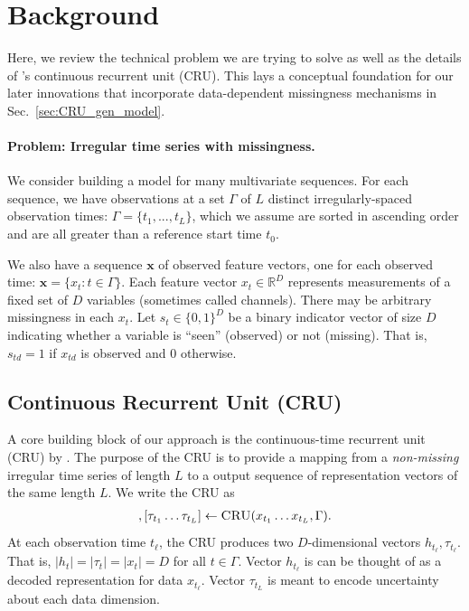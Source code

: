 \newcommand{\MExp}{{\small \textsc{MExp}}}
\section{Background}
Here, we review the technical problem we are trying to solve as well as the details of \citet{schirmer2022modeling}'s
continuous recurrent unit (CRU). 
This lays a conceptual foundation for our later innovations that incorporate data-dependent missingness mechanisms in Sec.~\ref{sec:CRU_gen_model}.


\paragraph{Problem: Irregular time series with missingness.}
We consider building a model for many multivariate sequences.
For each sequence, we have observations at a set $\Gamma$ of $L$ distinct irregularly-spaced observation times: $\Gamma=\{ t_1, ..., t_L\}$, which we assume are sorted in ascending order and are all greater than a reference start time $t_0$.

We also have a sequence $\mathbf{x}$ of observed feature vectors, one for each observed time: $\mathbf{x} = \{x_t : t \in \Gamma \}$. 
Each feature vector $x_t \in \mathbb{R}^D$ represents measurements of a fixed set of $D$ variables (sometimes called channels). There may be arbitrary missingness in each $x_t$. 
Let $s_t \in \{0, 1\}^D$ be a binary indicator vector of size $D$ indicating whether a variable is ``seen'' (observed) or not (missing). That is, $s_{td} = 1$ if $x_{td}$ is observed and 0 otherwise.

\subsection{Continuous Recurrent Unit (CRU)}
\label{sec:CRU}

A core building block of our approach is the continuous-time recurrent unit (CRU) by \citet{schirmer2022modeling}. The purpose of the CRU is to provide a  mapping from a \emph{non-missing} irregular time series of length $L$ to a output sequence of representation vectors of the same length $L$. We write the CRU as
\begin{align}
    [h_{t_1} \ldots h_{t_L}], [\tau_{t_1} \ldots \tau_{t_L}] \gets \textsc{CRU}(x_{t_1} \ldots x_{t_L}, \Gamma).
    \label{eq:CRU_as_RNN}
\end{align}
At each observation time $t_\ell$, the CRU produces two $D$-dimensional vectors $h_{t_{\ell}}, \tau_{t_{\ell}}$. That is, $|h_t|{=}|\tau_t|{=}|x_t|{=}D$ for all $t \in \Gamma$. Vector $h_{t_\ell}$ is can be thought of as a decoded representation for data $x_{t_\ell}$.
Vector $\tau_{t_L}$ is meant to encode uncertainty about each data dimension.

